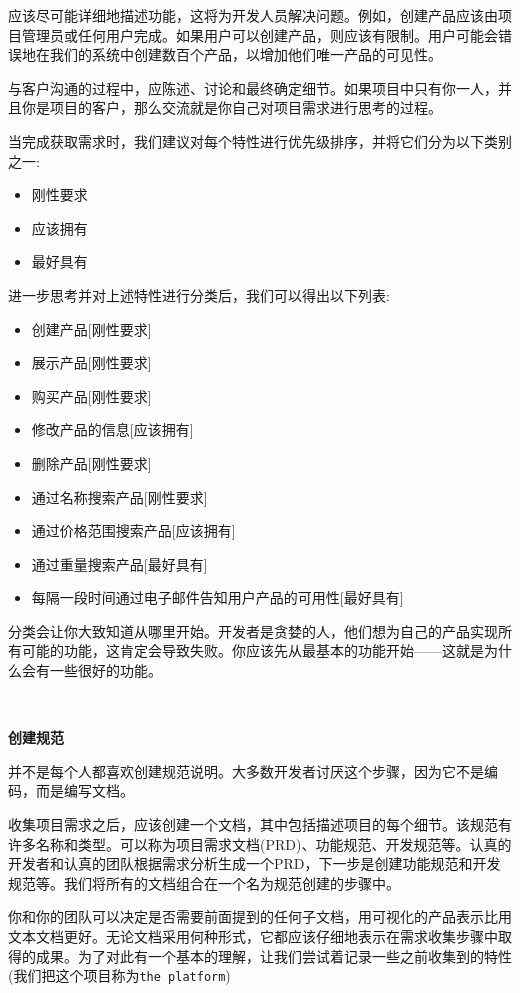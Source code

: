 应该尽可能详细地描述功能，这将为开发人员解决问题。例如，创建产品应该由项目管理员或任何用户完成。如果用户可以创建产品，则应该有限制。用户可能会错误地在我们的系统中创建数百个产品，以增加他们唯一产品的可见性。 \par
与客户沟通的过程中，应陈述、讨论和最终确定细节。如果项目中只有你一人，并且你是项目的客户，那么交流就是你自己对项目需求进行思考的过程。 \par
当完成获取需求时，我们建议对每个特性进行优先级排序，并将它们分为以下类别之一: \par

\begin{itemize}
	\item 刚性要求
	\item 应该拥有
	\item 最好具有
\end{itemize}

进一步思考并对上述特性进行分类后，我们可以得出以下列表: \par

\begin{itemize}
	\item 创建产品[刚性要求]
	\item 展示产品[刚性要求]
	\item 购买产品[刚性要求]
	\item 修改产品的信息[应该拥有]
	\item 删除产品[刚性要求]
	\item 通过名称搜索产品[刚性要求]
	\item 通过价格范围搜索产品[应该拥有]
	\item 通过重量搜索产品[最好具有]
	\item 每隔一段时间通过电子邮件告知用户产品的可用性[最好具有]
\end{itemize}

分类会让你大致知道从哪里开始。开发者是贪婪的人，他们想为自己的产品实现所有可能的功能，这肯定会导致失败。你应该先从最基本的功能开始——这就是为什么会有一些很好的功能。 \par

\noindent\textbf{}\ \par
\textbf{创建规范} \ \par
并不是每个人都喜欢创建规范说明。大多数开发者讨厌这个步骤，因为它不是编码，而是编写文档。 \par
收集项目需求之后，应该创建一个文档，其中包括描述项目的每个细节。该规范有许多名称和类型。可以称为项目需求文档(PRD)、功能规范、开发规范等。认真的开发者和认真的团队根据需求分析生成一个PRD，下一步是创建功能规范和开发规范等。我们将所有的文档组合在一个名为规范创建的步骤中。 \par
你和你的团队可以决定是否需要前面提到的任何子文档，用可视化的产品表示比用文本文档更好。无论文档采用何种形式，它都应该仔细地表示在需求收集步骤中取得的成果。为了对此有一个基本的理解，让我们尝试着记录一些之前收集到的特性(我们把这个项目称为\texttt{the platform}) \par


